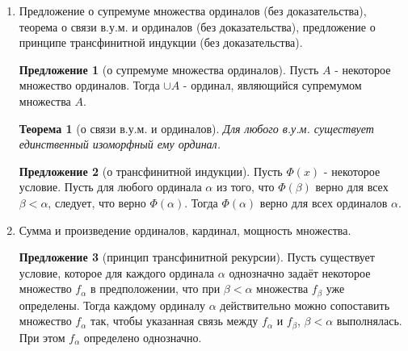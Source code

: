 \documentclass[a4paper]{article}
\newtheorem*{theorem*}{Теорема}
\theoremstyle{definition}
\newtheorem*{proposition*}{Предложение}
\begin{document}
\begin{enumerate}
       \begin{proof}
        \begin{enumerate}
         \item очевидно.
         \item если $\alpha \subseteq \beta$ и $\beta \subseteq \alpha$, то $\alpha = \beta$.
         \item если $\alpha \subseteq \beta$ и $\beta \subseteq \gamma$, то $\alpha \subseteq \gamma$.
         \item пусть $\delta = \alpha \cap \beta$. Легко проверить, что $\delta$ является ординалом. По лемме о порядке на ординалах $\delta \leq \alpha$ и $\delta \leq \beta$. Если $\delta = \alpha$ или $\delta = \beta$, утверждение доказано. Допустим, что $\delta \neq \alpha, \beta$. Тогда $\delta \in \alpha, \delta \in \beta$ и $\delta \in \alpha \cap \beta = \delta$, противоречие.
         \item пусть $S$ - непустое множество ординалов. По аксиоме регулярности $\exists \alpha \in S$, т.ч. $\alpha \cap S = \emptyset$. Если $\beta < \alpha$, то $\beta \in \alpha$ и $\beta \notin S$. Ясно, что $\alpha$ - минимальный элемент в $S$.
        \end{enumerate}
       \end{proof}
 \item Предложение о супремуме множества ординалов (без доказательства), теорема о связи в.у.м. и ординалов (без доказательства), предложение о принципе трансфинитной индукции (без доказательства).
       \begin{proposition*}[о супремуме множества ординалов]
        Пусть $A$ - некоторое множество ординалов. Тогда $\cup A$ - ординал, являющийся супремумом множества $A$.
       \end{proposition*}
       \begin{theorem*}[о связи в.у.м. и ординалов]
        Для любого в.у.м. существует единственный изоморфный ему ординал.
       \end{theorem*}
       \begin{proposition*}[о трансфинитной индукции]
        Пусть $\Phi(x)$ - некоторое условие. Пусть для любого ординала $\alpha$ из того, что $\Phi(\beta)$ верно для всех $\beta < \alpha$, следует, что верно $\Phi(\alpha)$. Тогда $\Phi(\alpha)$ верно для всех ординалов $\alpha$.
       \end{proposition*}
 \item Сумма и произведение ординалов, кардинал, мощность множества.
       \begin{proposition*}[принцип трансфинитной рекурсии]
        Пусть существует условие, которое для каждого ординала $\alpha$ однозначно задаёт некоторое множество $f_\alpha$ в предположении, что при $\beta < \alpha$ множества $f_\beta$ уже определены. Тогда каждому ординалу $\alpha$ действительно можно сопоставить множество $f_\alpha$ так, чтобы указанная связь между $f_\alpha$ и $f_\beta$, $\beta < \alpha$ выполнялась. При этом $f_\alpha$ определено однозначно.
       \end{proposition*}


\end{enumerate}
\end{document}

